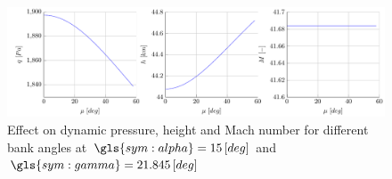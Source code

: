 \begin{figure}[ht!]
	\centering
	\includegraphics[width=\textwidth]{./Figure/orbit/effectmu.pdf}
	\caption{Effect on dynamic pressure, height and Mach number for different bank angles at $\gls{sym:alpha}=15 \left[deg\right]$ and $\gls{sym:gamma}=21.845 \left[deg\right]$}
	\label{fig:effectmu}
\end{figure}


